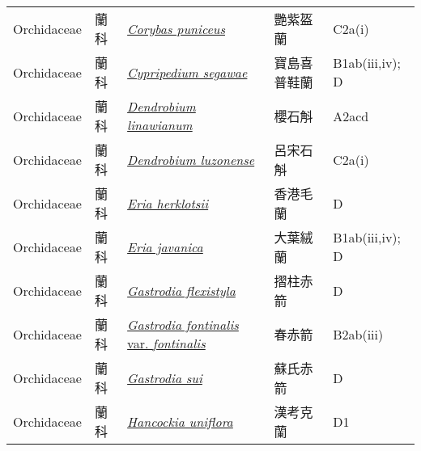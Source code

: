 {\begin{longtable}{p{2.5cm}p{2cm}p{5cm}p{2.5cm}p{3cm}}
    Orchidaceae & 蘭科 & \href{http://www.theplantlist.org/tpl1.1/search?q=Corybas+puniceus}{\textit{Corybas puniceus} } & 艷紫盔蘭 & C2a(i) \index{Corybas@\textit{Corybas}!puniceus@\textit{puniceus}}  \index{艷紫盔蘭} \\
    Orchidaceae & 蘭科 & \href{http://www.theplantlist.org/tpl1.1/search?q=Cypripedium+segawae}{\textit{Cypripedium segawae} } & 寶島喜普鞋蘭 & B1ab(iii,iv); D \index{Cypripedium@\textit{Cypripedium}!segawae@\textit{segawae}}  \index{寶島喜普鞋蘭} \\
    Orchidaceae & 蘭科 & \href{http://www.theplantlist.org/tpl1.1/search?q=Dendrobium+linawianum}{\textit{Dendrobium linawianum} } & 櫻石斛 & A2acd \index{Dendrobium@\textit{Dendrobium}!linawianum@\textit{linawianum}}  \index{櫻石斛} \\
    Orchidaceae & 蘭科 & \href{http://www.theplantlist.org/tpl1.1/search?q=Dendrobium+luzonense}{\textit{Dendrobium luzonense} } & 呂宋石斛 & C2a(i) \index{Dendrobium@\textit{Dendrobium}!luzonense@\textit{luzonense}}  \index{呂宋石斛} \\
    Orchidaceae & 蘭科 & \href{http://www.theplantlist.org/tpl1.1/search?q=Eria+herklotsii}{\textit{Eria herklotsii} } & 香港毛蘭 & D \index{Eria@\textit{Eria}!herklotsii@\textit{herklotsii}}  \index{香港毛蘭} \\
    Orchidaceae & 蘭科 & \href{http://www.theplantlist.org/tpl1.1/search?q=Eria+javanica}{\textit{Eria javanica} } & 大葉絨蘭 & B1ab(iii,iv); D \index{Eria@\textit{Eria}!javanica@\textit{javanica}}  \index{大葉絨蘭} \\
    Orchidaceae & 蘭科 & \href{http://www.theplantlist.org/tpl1.1/search?q=Gastrodia+flexistyla}{\textit{Gastrodia flexistyla} } & 摺柱赤箭 & D \index{Gastrodia@\textit{Gastrodia}!flexistyla@\textit{flexistyla}}  \index{摺柱赤箭} \\
    Orchidaceae & 蘭科 & \href{http://www.theplantlist.org/tpl1.1/search?q=Gastrodia+fontinalis+var.+fontinalis}{\textit{Gastrodia fontinalis} var. \textit{fontinalis} } & 春赤箭 & B2ab(iii) \index{Gastrodia@\textit{Gastrodia}!fontinalis@\textit{fontinalis}!var. fontinalis@var. \textit{fontinalis}}  \index{春赤箭} \\
    Orchidaceae & 蘭科 & \href{http://www.theplantlist.org/tpl1.1/search?q=Gastrodia+sui}{\textit{Gastrodia sui} } & 蘇氏赤箭 & D \index{Gastrodia@\textit{Gastrodia}!sui@\textit{sui}}  \index{蘇氏赤箭} \\
    Orchidaceae & 蘭科 & \href{http://www.theplantlist.org/tpl1.1/search?q=Hancockia+uniflora}{\textit{Hancockia uniflora} } & 漢考克蘭 & D1 \index{Hancockia@\textit{Hancockia}!uniflora@\textit{uniflora}}  \index{漢考克蘭} \\

\end{longtable}}
